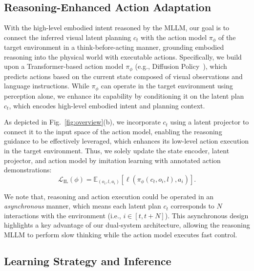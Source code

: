 \subsection{Reasoning-Enhanced Action Adaptation}
\label{ssec:action}

With the high-level embodied intent reasoned by the MLLM, our goal is to connect the inferred visual latent planning $c_t$ with the action model $\pi_\phi$ of the target environment in a think-before-acting manner, grounding embodied reasoning into the physical world with executable actions.
Specifically, we build upon a Transformer-based action model $\pi_\phi$ (e.g., Diffusion Policy~\cite{chi2023diffusion}), which predicts actions based on the current state composed of visual observations and language instructions. While $\pi_\phi$ can operate in the target environment using perception alone, we enhance its capability by conditioning it on the latent plan $c_t$, which encodes high-level embodied intent and planning context.

As depicted in Fig.~\ref{fig:overview}(b), we incorporate $c_t$ using a latent projector to connect it to the input space of the action model, enabling the reasoning guidance to be effectively leveraged, which enhances its low-level action execution in the target environment. Thus, we solely update the state encoder, latent projector, and action model by imitation learning with annotated action demonstrations: 
\begin{equation} \mathcal{L}_{\text{IL}}(\phi) = \mathbb{E}_{(o_i, l, a_i)} \left[ \ell\left(\pi_\phi(c_{t}, o_i, l), a_i \right) \right]. \end{equation} 

We note that, reasoning and action execution could be operated in an \textit{asynchronous} manner, which means each latent plan $c_t$ corresponds to $N$ interactions with the environment (i.e., $i\in[t, t+N]$). This asynchronous design highlights a key advantage of our dual-system architecture, allowing the reasoning MLLM to perform slow thinking while the action model executes fast control.



\subsection{Learning Strategy and Inference}

